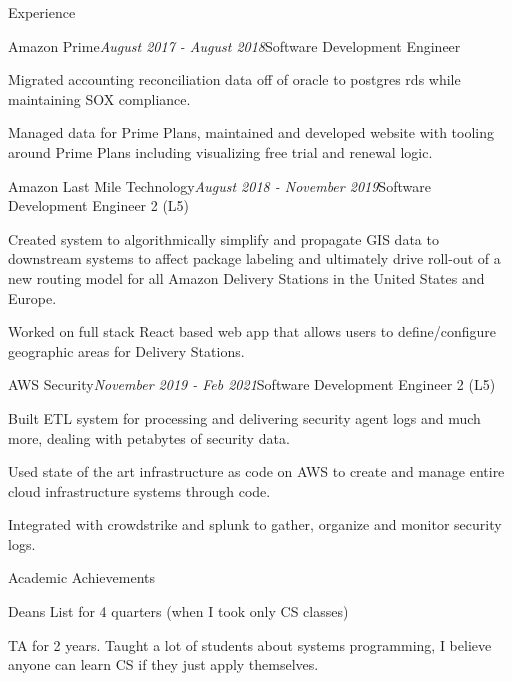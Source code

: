 \documentclass{resume} %
\begin{document}
\begin{rSection}{Experience}

\begin{rSubsection}{Amazon Prime}{\em August 2017 - August 2018}{Software Development Engineer}{}
\item Migrated accounting reconciliation data off of oracle to postgres rds while maintaining SOX compliance.
\item Managed data for Prime Plans, maintained and developed website with tooling around Prime Plans including visualizing free trial and renewal logic.
\end{rSubsection}


\begin{rSubsection}{Amazon Last Mile Technology}{\em August 2018 - November 2019}{Software Development Engineer 2 (L5)}{}
\item Created system to algorithmically simplify and propagate GIS data to downstream systems to affect package labeling and ultimately drive roll-out of a new routing model for all Amazon Delivery Stations in the United States and Europe.
\item Worked on full stack React based web app that allows users to define/configure geographic areas for Delivery Stations.
\end{rSubsection}

\begin{rSubsection}{AWS Security}{\em November 2019 - Feb 2021}{Software Development Engineer 2 (L5)}{}
\item Built ETL system for processing and delivering security agent logs and much more, dealing with petabytes of security data.
\item Used state of the art infrastructure as code on AWS to create and manage entire cloud infrastructure systems through code.
\item Integrated with crowdstrike and splunk to gather, organize and monitor security logs.
\end{rSubsection}
\end{rSection}


\begin{rSection}{Academic Achievements} \itemsep -2pt
\item Deans List for 4 quarters (when I took only CS classes)
\item TA for 2 years. Taught a lot of students about systems programming, I believe anyone can learn CS if they just apply themselves.
\end{rSection}
\end{document}
